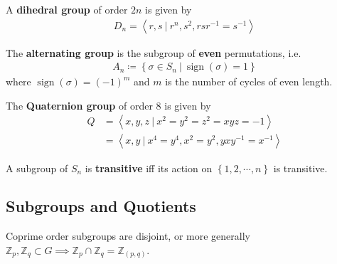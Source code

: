 \begin{definition}

A \textbf{dihedral group} of order \(2n\) is given by
\begin{align*}
D_n = \left\langle{r, s {~\mathrel{\Big|}~}r^n, s^2, rsr^{-1}= s^{-1}}\right\rangle
\end{align*}

\begin{definition}

The \textbf{alternating group} is the subgroup of \textbf{even}
permutations, i.e.
\begin{align*}
A_n \coloneqq\left\{{\sigma \in S_n {~\mathrel{\Big|}~}\operatorname{sign}(\sigma) = 1}\right\}
\end{align*}
where \(\operatorname{sign}(\sigma) = (-1)^{m}\) and \(m\) is the number
of cycles of even length.

\end{definition}

\begin{definition}

The \textbf{Quaternion group} of order 8 is given by
\begin{align*}
Q &= \left\langle{x,y,z {~\mathrel{\Big|}~}x^2 = y^2 = z^2 = xyz = -1}\right\rangle \\
  &= \left\langle{x, y {~\mathrel{\Big|}~}x^4 = y^4, x^2 = y^2, yxy^{-1}= x^{-1}}\right\rangle
\end{align*}

\end{definition}

\begin{definition}

A subgroup of \(S_n\) is \textbf{transitive} iff its action on
\(\left\{{1, 2, \cdots, n}\right\}\) is transitive.

\end{definition}

\hypertarget{subgroups-and-quotients}{%
\subsection{Subgroups and Quotients}\label{subgroups-and-quotients}}

\begin{fact}

Coprime order subgroups are disjoint, or more generally
\({\mathbb{Z}}_p, {\mathbb{Z}}_q \subset G \implies {\mathbb{Z}}_p \cap{\mathbb{Z}}_q = {\mathbb{Z}}_{(p,q)}\).


\end{fact}
\end{definition}
